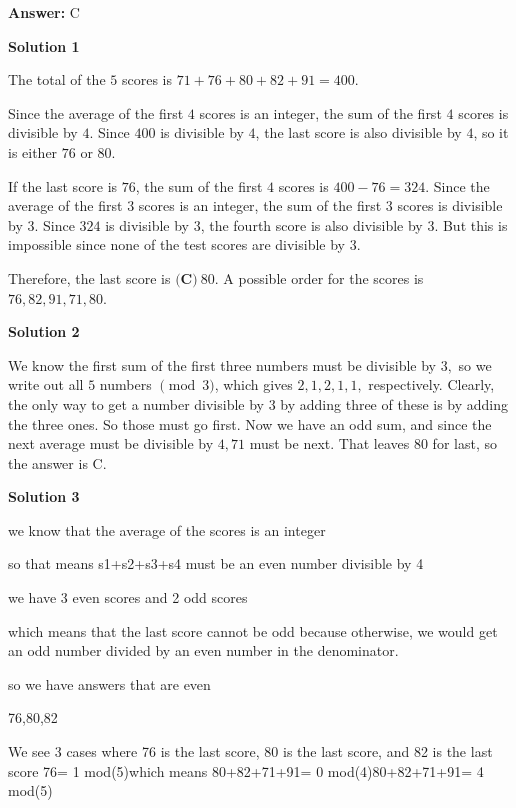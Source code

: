 \begin{enumerate}
 \textbf{Answer: }C



\textbf{Solution 1}

The total of the $5$ scores is $71+76+80+82+91=400$.

 Since the average of the first $4$ scores is an integer, the sum of the first $4$ scores is divisible by $4$.  Since $400$ is divisible by $4$, the last score is also divisible by $4$, so it is either $76$ or $80$.

 If the last score is $76$, the sum of the first $4$ scores is $400-76=324$.  Since the average of the first $3$ scores is an integer, the sum of the first $3$ scores is divisible by $3$.  Since $324$ is divisible by $3$, the fourth score is also divisible by $3$.  But this is impossible since none of the test scores are divisible by $3$.

 Therefore, the last score is $\boxed{\textbf{(C)}\ 80}$.  A possible order for the scores is $76,82,91,71,80$.

 



\textbf{Solution 2}

We know the first sum of the first three numbers must be divisible by $3,$ so we write out all $5$ numbers $\pmod{3}$, which gives $2,1,2,1,1,$ respectively. Clearly, the only way to get a number divisible by $3$ by adding three of these is by adding the three ones. So those must go first. Now we have an odd sum, and since the next average must be divisible by $4, 71$ must be next. That leaves $80$ for last, so the answer is $\mathrm{C}$.

 



\textbf{Solution 3}

we know that the average of the scores is an integer 

 so that means s1+s2+s3+s4 must be an even number divisible by 4 

 we have 3 even scores and 2 odd scores

 which means that the last score cannot be odd because otherwise, we would get an odd number divided by an even number in the denominator.

 so we have answers that are even 

 76,80,82

 We see 3 cases where 76 is the last score, 80 is the last score, and 82 is the last score  76= 1 mod(5)which means 80+82+71+91= 0 mod(4)80+82+71+91= 4 mod(5)


\end{enumerate}
